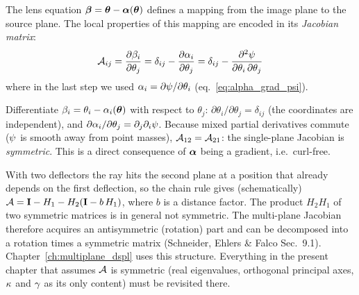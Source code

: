 The lens equation $\boldsymbol{\beta} = \boldsymbol{\theta} - \boldsymbol{\alpha}(\boldsymbol{\theta})$
defines a mapping from the image plane to the source plane.  The
local properties of this mapping are encoded in its
\emph{Jacobian matrix}:
\begin{equation}
    \mathcal{A}_{ij} = \frac{\partial \beta_i}{\partial \theta_j}
    = \delta_{ij} - \frac{\partial \alpha_i}{\partial \theta_j}
    = \delta_{ij}
    - \frac{\partial^2 \psi}{\partial\theta_i\,\partial\theta_j}
    \label{eq:jacobian_def}
\end{equation}
where in the last step we used
$\alpha_i = \partial\psi/\partial\theta_i$
(eq.~\ref{eq:alpha_grad_psi}).
\begin{derivation}
Differentiate $\beta_i = \theta_i - \alpha_i(\boldsymbol{\theta})$ with respect to
$\theta_j$: $\partial\theta_i/\partial\theta_j = \delta_{ij}$ (the coordinates
are independent), and
$\partial\alpha_i/\partial\theta_j = \partial_j\partial_i\psi$. Because mixed
partial derivatives commute ($\psi$ is smooth away from point masses),
$\mathcal{A}_{12} = \mathcal{A}_{21}$: the single-plane Jacobian is \emph{symmetric}. This
is a direct consequence of $\boldsymbol{\alpha}$ being a gradient, i.e.\ curl-free.
\end{derivation}
\begin{bridge}
With two deflectors the ray hits the second plane at a position that already depends
on the first deflection, so the chain rule gives (schematically)
$\mathcal{A} = \mathbf{I} - H_1 - H_2(\mathbf{I} - b\,H_1)$, where $b$ is a
distance factor. The product $H_2H_1$ of two symmetric matrices is in general
not symmetric. The multi-plane Jacobian therefore acquires an antisymmetric
(rotation) part and can be decomposed into a rotation times a symmetric matrix
(Schneider, Ehlers \& Falco Sec.~9.1). Chapter~\ref{ch:multiplane_dspl} uses
this structure. Everything in the present chapter that assumes $\mathcal{A}$ is
symmetric (real eigenvalues, orthogonal principal axes, $\kappa$ and
$\gamma$ as its only content) must be revisited there.
\end{bridge}

